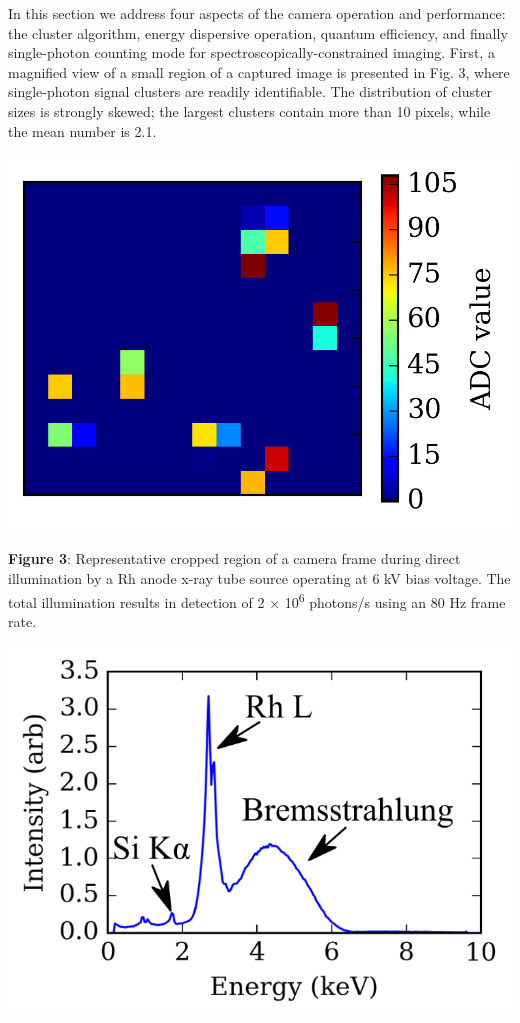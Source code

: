 In this section we address four aspects of the camera operation and
performance: the cluster algorithm, energy dispersive operation, quantum
efficiency, and finally single-photon counting mode for
spectroscopically-constrained imaging. First, a magnified view of a
small region of a captured image is presented in Fig. 3, where
single-photon signal clusters are readily identifiable. The distribution
of cluster sizes is strongly skewed; the largest clusters contain more
than 10 pixels, while the mean number is 2.1.

\begin{center}
\includegraphics{NewCameraPaper_1.10.docx1502867018/media/image3.png}
\end{center}

\textbf{Figure 3}: Representative cropped region of a camera frame
during direct illumination by a Rh anode x-ray tube source operating at
6 kV bias voltage. The total illumination results in detection of 2 ×
10\textsuperscript{6} photons/s using an 80 Hz frame rate.
\bigbreak

\begin{center}
\includegraphics{NewCameraPaper_1.10.docx1502867018/media/image4.png}
\end{center}


